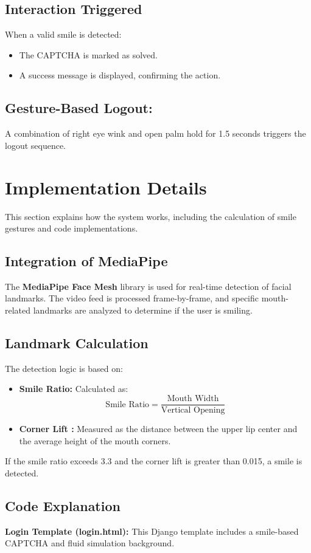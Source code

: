 \documentclass[12pt]{article}
\begin{document}
\subsection{Interaction Triggered}
When a valid smile is detected:
\begin{itemize}
    \item The CAPTCHA is marked as solved.
    \item A success message is displayed, confirming the action.
\end{itemize}

\subsection{Gesture-Based Logout:} A combination of right eye wink and open palm hold for 1.5 seconds triggers the logout sequence.

\section{Implementation Details}
This section explains how the system works, including the calculation of smile gestures and code implementations.

\subsection{Integration of MediaPipe}
The \textbf{MediaPipe Face Mesh} library is used for real-time detection of facial landmarks. The video feed is processed frame-by-frame, and specific mouth-related landmarks are analyzed to determine if the user is smiling.

\subsection{Landmark Calculation}
The detection logic is based on:
\begin{itemize}
    \item \textbf{Smile Ratio:} Calculated as:
    \[
    \text{Smile Ratio} = \frac{\text{Mouth Width}}{\text{Vertical Opening}}
    \]
    \item \textbf{Corner Lift  :} Measured as the distance between the upper lip center and the average height of the mouth corners.
\end{itemize}

If the smile ratio exceeds 3.3 and the corner lift is greater than 0.015, a smile is detected.

\subsection{Code Explanation}
\textbf{Login Template (login.html):} This Django template includes a smile-based CAPTCHA and fluid simulation background.
\end{document}
